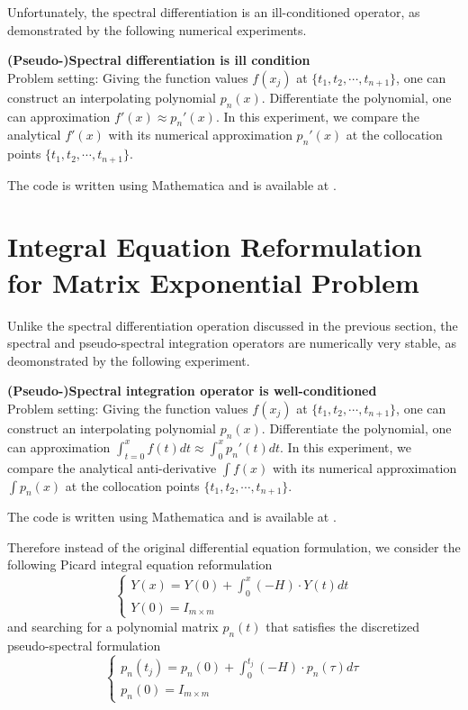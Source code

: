 \documentclass[12pt]{article}
\begin{document}
Unfortunately, the spectral differentiation is an ill-conditioned operator, as demonstrated 
by the following numerical experiments.

{\noindent \bf (Pseudo-)Spectral differentiation is ill condition} \\
Problem setting: Giving the function values $f(x_j)$ at $\{ t_1, t_2, \cdots, t_{n+1}\}$,
one can construct an interpolating polynomial $p_n(x)$. Differentiate the polynomial, one 
can approximation $f'(x) \approx p_n'(x)$. In this experiment, we compare the analytical 
$f'(x)$ with its numerical approximation $p_n'(x)$ at the collocation points 
$\{ t_1, t_2, \cdots, t_{n+1}\}$.

The code is written using Mathematica and is available at .

\section{Integral Equation Reformulation for Matrix Exponential Problem}
\label{sec:iem}
Unlike the spectral differentiation operation discussed in the previous section, the
spectral and pseudo-spectral integration operators are numerically very stable, as deomonstrated by
the following experiment.

{ \noindent \bf (Pseudo-)Spectral integration operator is well-conditioned} \\
Problem setting: Giving the function values $f(x_j)$ at $\{ t_1, t_2, \cdots, t_{n+1}\}$,
one can construct an interpolating polynomial $p_n(x)$. Differentiate the polynomial, one 
can approximation $\int_{t=0}^x f(t)dt \approx \int_0^x p_n'(t) dt$. In this experiment, 
we compare the analytical anti-derivative $\int f(x)$ with its numerical approximation 
$\int p_n(x)$ at the collocation points $\{ t_1, t_2, \cdots, t_{n+1}\}$.

The code is written using Mathematica and is available at .

Therefore instead of the original differential equation formulation, we consider the following Picard
integral equation reformulation
\begin{equation}
	\left\{
		\begin{array}{l}
			Y(x)= Y(0) + \int_0^x (-H) \cdot Y(t) dt \\
			Y(0) = I_{m\times m}
		\end{array}
	\right.
\end{equation}
and searching for a polynomial matrix $p_n(t)$ that satisfies the discretized 
pseudo-spectral formulation
\begin{equation}
	\label{eq:iem}
	\left\{
		\begin{array}{l}
			p_n(t_j)=p_n(0) + \int_0^{t_j} (-H) \cdot p_n(\tau) d\tau \\
			p_n(0) = I_{m\times m}
		\end{array}
	\right.
\end{equation}
\end{document}
